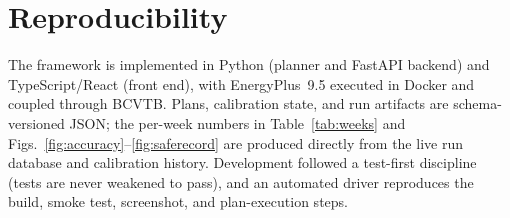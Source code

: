 \documentclass[11pt]{article}
\begin{document}
\section*{Reproducibility}
The framework is implemented in Python (planner and FastAPI backend) and TypeScript/React
(front end), with EnergyPlus~9.5 executed in Docker and coupled through BCVTB. Plans,
calibration state, and run artifacts are schema-versioned JSON; the per-week numbers in
Table~\ref{tab:weeks} and Figs.~\ref{fig:accuracy}--\ref{fig:saferecord} are produced
directly from the live run database and calibration history. Development followed a
test-first discipline (tests are never weakened to pass), and an automated driver reproduces
the build, smoke test, screenshot, and plan-execution steps.
\end{document}

